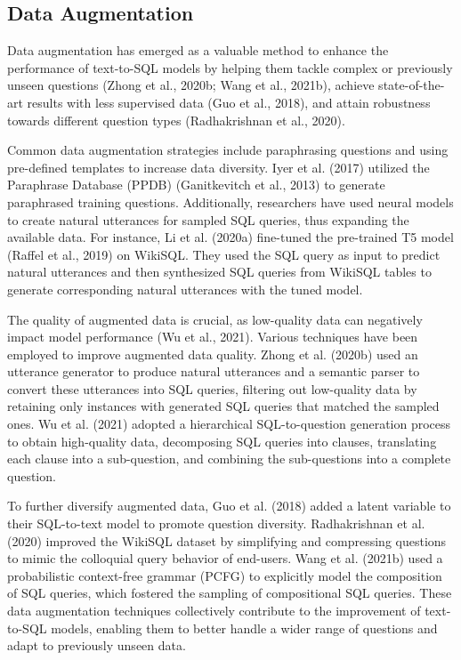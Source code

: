 \subsection{Data Augmentation}
\label{sec:augmentation}

Data augmentation has emerged as a valuable method to enhance the performance of text-to-SQL models by helping them tackle complex or previously unseen questions (Zhong et al., 2020b; Wang et al., 2021b), achieve state-of-the-art results with less supervised data (Guo et al., 2018), and attain robustness towards different question types (Radhakrishnan et al., 2020).

Common data augmentation strategies include paraphrasing questions and using pre-defined templates to increase data diversity. Iyer et al. (2017) utilized the Paraphrase Database (PPDB) (Ganitkevitch et al., 2013) to generate paraphrased training questions. Additionally, researchers have used neural models to create natural utterances for sampled SQL queries, thus expanding the available data. For instance, Li et al. (2020a) fine-tuned the pre-trained T5 model (Raffel et al., 2019) on WikiSQL. They used the SQL query as input to predict natural utterances and then synthesized SQL queries from WikiSQL tables to generate corresponding natural utterances with the tuned model.

The quality of augmented data is crucial, as low-quality data can negatively impact model performance (Wu et al., 2021). Various techniques have been employed to improve augmented data quality. Zhong et al. (2020b) used an utterance generator to produce natural utterances and a semantic parser to convert these utterances into SQL queries, filtering out low-quality data by retaining only instances with generated SQL queries that matched the sampled ones. Wu et al. (2021) adopted a hierarchical SQL-to-question generation process to obtain high-quality data, decomposing SQL queries into clauses, translating each clause into a sub-question, and combining the sub-questions into a complete question.

To further diversify augmented data, Guo et al. (2018) added a latent variable to their SQL-to-text model to promote question diversity. Radhakrishnan et al. (2020) improved the WikiSQL dataset by simplifying and compressing questions to mimic the colloquial query behavior of end-users. Wang et al. (2021b) used a probabilistic context-free grammar (PCFG) to explicitly model the composition of SQL queries, which fostered the sampling of compositional SQL queries. These data augmentation techniques collectively contribute to the improvement of text-to-SQL models, enabling them to better handle a wider range of questions and adapt to previously unseen data.